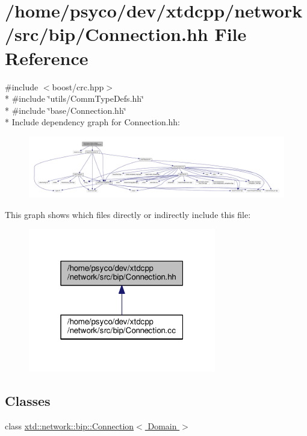 \hypertarget{bip_2Connection_8hh}{}\section{/home/psyco/dev/xtdcpp/network/src/bip/\+Connection.hh File Reference}
\label{bip_2Connection_8hh}
{\ttfamily \#include $<$boost/crc.\+hpp$>$}\\*
{\ttfamily \#include \char`\"{}utils/\+Comm\+Type\+Defs.\+hh\char`\"{}}\\*
{\ttfamily \#include \char`\"{}base/\+Connection.\+hh\char`\"{}}\\*
Include dependency graph for Connection.\+hh\+:
\nopagebreak
\begin{figure}[H]
\begin{center}
\leavevmode
\includegraphics[width=350pt]{bip_2Connection_8hh__incl}
\end{center}
\end{figure}
This graph shows which files directly or indirectly include this file\+:
\nopagebreak
\begin{figure}[H]
\begin{center}
\leavevmode
\includegraphics[width=232pt]{bip_2Connection_8hh__dep__incl}
\end{center}
\end{figure}
\subsection*{Classes}
\begin{DoxyCompactItemize}
\item 
class \hyperlink{classxtd_1_1network_1_1bip_1_1Connection}{xtd\+::network\+::bip\+::\+Connection$<$ Domain $>$}
\end{DoxyCompactItemize}
